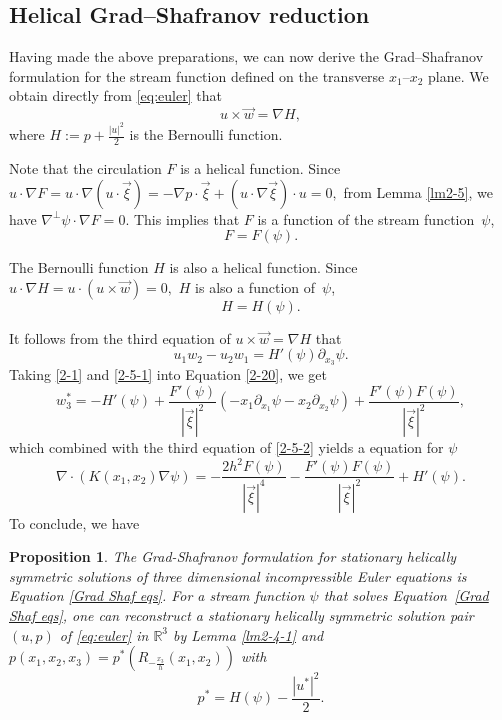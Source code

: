 \documentclass[12pt,reqno]{amsart}
\numberwithin{equation}{section}
\newtheorem{proposition}[theorem]{Proposition}
\theoremstyle{definition}
\theoremstyle{remark}
\begin{document}
\subsection{Helical Grad--Shafranov reduction}
Having made   the above preparations,  we can now derive the Grad--Shafranov formulation  for the stream function defined on the transverse $ x_1 $--$ x_2 $ plane.   %
We obtain directly  from \eqref{eq:euler} that $$ u\times \vec{w}=\nabla H, $$
 where $ H:=p+\frac{|u|^2}{2} $ is the Bernoulli function.
 
Note that the circulation $ F $ is a helical function. Since $ u\cdot\nabla F=u\cdot\nabla(u\cdot\vec{\xi})=-\nabla p\cdot\vec{\xi}+(u\cdot\nabla\vec{\xi})\cdot u=0, $
from Lemma \ref{lm2-5}, we have $ \nabla^\perp\psi\cdot \nabla F=0 $. This implies that $ F $ is a function of the stream function~$ \psi $,   $$ F=F(\psi). $$

The Bernoulli function $ H $ is also a helical function. Since $ u\cdot\nabla H=u\cdot(u\times \vec{w})=0, $   $ H $ is also a function of~$ \psi $,  $$ H=H(\psi). $$

It follows from the third equation of $ u\times \vec{w}=\nabla H $ that
\begin{equation}\label{2-20}
u_1w_2-u_2w_1=H'(\psi)\partial_{x_3}\psi.
\end{equation}
Taking \eqref{2-1} and \eqref{2-5-1} into Equation \eqref{2-20}, we get
\begin{equation*} 
w_3^*=-H'(\psi)+\frac{F'(\psi)}{|\vec{\xi}|^2}\left( -x_1\partial_{x_1}\psi-x_2\partial_{x_2}\psi\right) +\frac{F'(\psi)F(\psi)}{|\vec{\xi}|^2},
\end{equation*}
which combined with the third equation of \eqref{2-5-2} yields a equation for $ \psi $
\begin{equation*} 
\nabla\cdot(K(x_1,x_2)\nabla\psi)=-\frac{2h^2F(\psi)}{|\vec{\xi}|^4}-\frac{F'(\psi)F(\psi)}{|\vec{\xi}|^2}+H'(\psi).
\end{equation*}
To conclude, we have
\begin{proposition}\label{pp2-7}
The Grad-Shafranov formulation for stationary helically symmetric solutions of three dimensional incompressible Euler equations  is Equation \eqref{Grad Shaf eqs}. For a stream function $ \psi $ that solves Equation~\eqref{Grad Shaf eqs}, one can reconstruct a stationary helically symmetric solution pair $ (u,p) $ of \eqref{eq:euler} in $ \mathbb{R}^3 $ by Lemma \ref{lm2-4-1} and $ p(x_1,x_2,x_3)=p^*\left (R_{-\frac{x_3}{h}}(x_1,x_2)\right ) $ with
$$p^*=H(\psi)-\frac{|u^*|^2}{2}.$$
\end{proposition}
\end{document}
